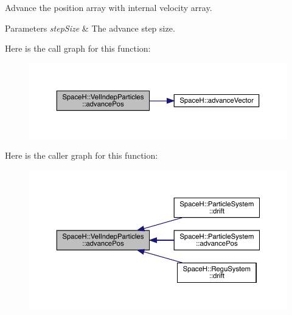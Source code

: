 Advance the position array with internal velocity array. 


\begin{DoxyParams}{Parameters}
{\em step\+Size} & The advance step size. \\
\hline
\end{DoxyParams}
Here is the call graph for this function\+:
\nopagebreak
\begin{figure}[H]
\begin{center}
\leavevmode
\includegraphics[width=350pt]{class_space_h_1_1_vel_indep_particles_a19941153b3529267f5bfa6e7b6e2d4ff_cgraph}
\end{center}
\end{figure}
Here is the caller graph for this function\+:
\nopagebreak
\begin{figure}[H]
\begin{center}
\leavevmode
\includegraphics[width=350pt]{class_space_h_1_1_vel_indep_particles_a19941153b3529267f5bfa6e7b6e2d4ff_icgraph}
\end{center}
\end{figure}
\mbox{\label{class_space_h_1_1_vel_indep_particles_a75d5a3918dd3ceb323796c425baa3710}} 
